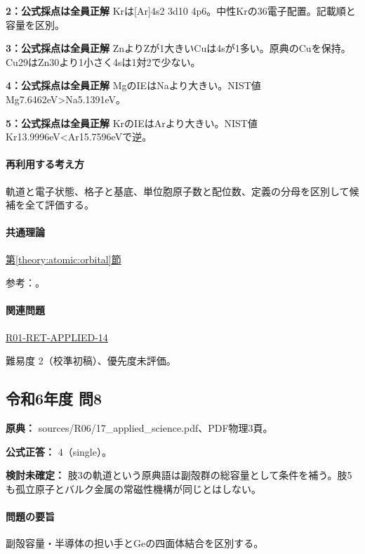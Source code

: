 \noindent\textbf{2：公式採点は全員正解} Krは[Ar]4s2 3d10 4p6。中性Krの36電子配置。記載順と容量を区別。\par

\noindent\textbf{3：公式採点は全員正解} ZnよりZが1大きいCuは4sが1多い。原典のCuを保持。Cu29はZn30より1小さく4sは1対2で少ない。\par

\noindent\textbf{4：公式採点は全員正解} MgのIEはNaより大きい。NIST値Mg7.6462eV>Na5.1391eV。\par

\noindent\textbf{5：公式採点は全員正解} KrのIEはArより大きい。NIST値Kr13.9996eV<Ar15.7596eVで逆。\par

\paragraph{再利用する考え方} 軌道と電子状態、格子と基底、単位胞原子数と配位数、定義の分母を区別して候補を全て評価する。

\paragraph{共通理論} \hyperref[theory:atomic:orbital]{第\ref*{theory:atomic:orbital}節}

\par 参考：\cite{atomic_nist2019}。

\paragraph{関連問題} \hyperref[q:r01-ret-applied-14]{R01-RET-APPLIED-14}

\par 難易度 2（校準初稿）、優先度未評価。

\subsection{令和6年度 問8}
\label{q:r06-reg-applied-08}

\noindent\textbf{原典：} sources/R06/17\_applied\_science.pdf、PDF物理3頁。

\textbf{公式正答：} 4（single）。

\par\textbf{検討未確定：} 肢3の軌道という原典語は副殻群の総容量として条件を補う。肢5も孤立原子とバルク金属の常磁性機構が同じとはしない。

\paragraph{問題の要旨} 副殻容量・半導体の担い手とGeの四面体結合を区別する。

